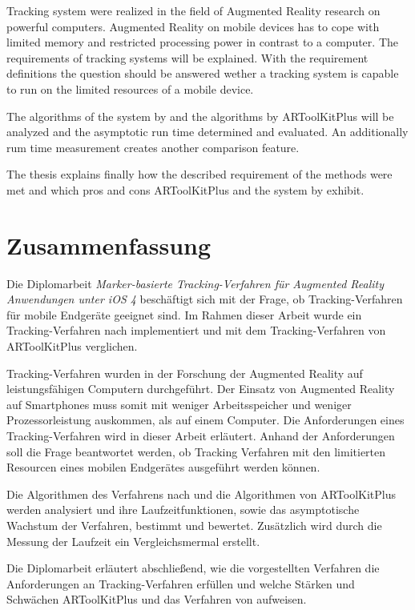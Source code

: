 Tracking system were realized in the field of Augmented Reality research on powerful computers. Augmented Reality on mobile devices has to cope with limited memory and restricted processing power in contrast to a computer. The requirements of tracking systems will be explained. With the requirement definitions the question should be answered wether a tracking system is capable to run on the limited resources of a mobile device.

The algorithms of the system by \citeauthor{hirzer08} and the algorithms by ARToolKitPlus will be analyzed and the asymptotic run time determined and evaluated. An additionally rum time measurement creates another comparison feature.

The thesis explains finally how the described requirement of the methods were met and which pros and cons ARToolKitPlus and the system by \citeauthor{hirzer08} exhibit.

\chapter*{Zusammenfassung} %
\label{cha:abstract-deu}
Die Diplomarbeit \emph{Marker-basierte Tracking-Verfahren für Augmented Reality Anwendungen unter iOS 4} beschäftigt
 sich mit der Frage, ob Tracking-Verfahren für mobile Endgeräte geeignet sind. Im Rahmen dieser Arbeit wurde ein
 Tracking-Verfahren nach \citeauthor{hirzer08} implementiert und mit dem Tracking-Verfahren von ARToolKitPlus
 verglichen.

Tracking-Verfahren wurden in der Forschung der Augmented Reality auf leistungsfähigen Computern durchgeführt. Der
 Einsatz von Augmented Reality auf Smartphones muss somit mit weniger Arbeitsspeicher und weniger Prozessorleistung
 auskommen, als auf einem Computer. Die Anforderungen eines Tracking-Verfahren wird in dieser Arbeit erläutert. Anhand
 der Anforderungen soll die Frage beantwortet werden, ob Tracking Verfahren mit den limitierten Resourcen eines
 mobilen Endgerätes ausgeführt werden können.

Die Algorithmen des Verfahrens nach \citeauthor{hirzer08} und die Algorithmen von ARToolKitPlus werden analysiert und
 ihre Laufzeitfunktionen, sowie das asymptotische Wachstum der Verfahren, bestimmt und bewertet. Zusätzlich wird durch
 die Messung der Laufzeit ein Vergleichsmermal erstellt.

Die Diplomarbeit erläutert abschließend, wie die vorgestellten Verfahren die Anforderungen an Tracking-Verfahren
 erfüllen und welche Stärken und Schwächen ARToolKitPlus und das Verfahren von \citeauthor{hirzer08} aufweisen.


